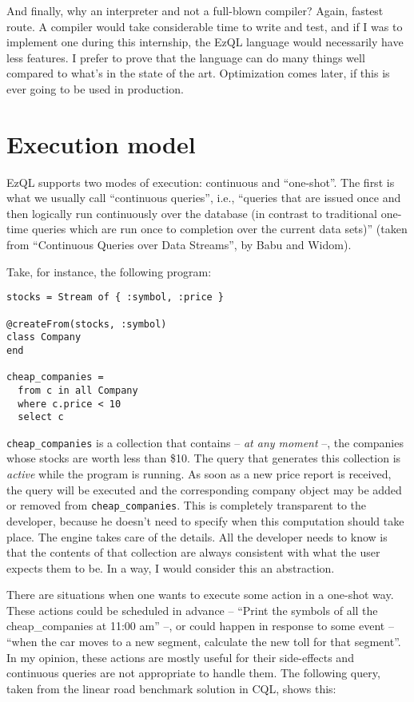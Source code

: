 \documentclass{report}
\begin{document}
And finally, why an interpreter and not a full-blown compiler? Again,
fastest route. A compiler would take considerable time to write and
test, and if I was to implement one during this internship, the EzQL
language would necessarily have less features. I prefer to prove that
the language can do many things well compared to what's in the state
of the art. Optimization comes later, if this is ever going to be used
in production.

\chapter{Execution model}

EzQL supports two modes of execution: continuous and ``one-shot''. The
first is what we usually call ``continuous queries'', i.e., ``queries
that are issued once and then logically run continuously over the
database (in contrast to traditional one-time queries which are run
once to completion over the current data sets)'' (taken from
``Continuous Queries over Data Streams'', by Babu and Widom).

Take, for instance, the following program:

\begin{verbatim}
stocks = Stream of { :symbol, :price }

@createFrom(stocks, :symbol)
class Company
end

cheap_companies =
  from c in all Company
  where c.price < 10
  select c
\end{verbatim}

\verb=cheap_companies= is a collection that contains -- \emph{at any
  moment} --, the companies whose stocks are worth less than \$10. The
query that generates this collection is \emph{active} while the
program is running. As soon as a new price report is received, the
query will be executed and the corresponding company object may be
added or removed from \verb=cheap_companies=. This is completely
transparent to the developer, because he doesn't need to specify when
this computation should take place. The engine takes care of the
details. All the developer needs to know is that the contents of that
collection are always consistent with what the user expects them to
be. In a way, I would consider this an abstraction.

There are situations when one wants to execute some action in a
one-shot way. These actions could be scheduled in advance -- ``Print
the symbols of all the cheap\_companies at 11:00 am'' --, or could
happen in response to some event -- ``when the car moves to a new
segment, calculate the new toll for that segment''. In my opinion,
these actions are mostly useful for their side-effects and continuous
queries are not appropriate to handle them. The following query, taken
from the linear road benchmark solution in CQL, shows this:
\end{document}
